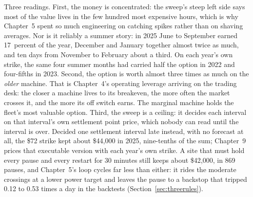 Three readings. First, the money is concentrated: the sweep's steep left side says most of the value lives in the few hundred most expensive hours, which is why Chapter~5 spent so much engineering on catching spikes rather than on shaving averages. %
Nor is it reliably a summer story: in 2025 June to September earned 17~percent of the year, December and January together almost twice as much, and ten days from November to February about a third. On each year's own strike, the same four summer months had carried half the option in 2022 and four-fifths in 2023. %
Second, the option is worth almost three times as much on the \emph{older} machine. That is Chapter~4's operating leverage arriving on the trading desk: the closer a machine lives to its breakeven, the more often the market crosses it, and the more its off switch earns. The marginal machine holds the fleet's most valuable option. %
Third, the sweep is a ceiling: it decides each interval on that interval's own settlement point price, which nobody can read until the interval is over. Decided one settlement interval late instead, with no forecast at all, the \$72 strike kept about \$44,000 in 2025, nine-tenths of the sum; Chapter~9 prices that executable version with each year's own strike. %
A site that must hold every pause and every restart for 30 minutes still keeps about \$42,000, in 869 pauses, and Chapter~5's loop cycles far less than either: it rides the moderate crossings at a lower power target and leaves the pause to a backstop that tripped 0.12 to 0.53 times a day in the backtests (Section~\ref{sec:threerules}). %

